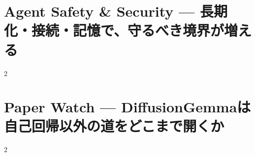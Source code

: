 \documentclass[lualatex,a4paper,11pt]{jlreq}
\begin{document}
\clearpage
\section{Agent Safety \& Security — 長期化・接続・記憶で、守るべき境界が増える}
\label{pkg:agent-safety-security-july}
\vspace{0.15em}
\begin{multicols}{2}

\end{multicols}
\Needspace{0.34\textheight}

\medskip


\clearpage
\section{Paper Watch — DiffusionGemmaは自己回帰以外の道をどこまで開くか}
\label{pkg:paper-watch-july}
\vspace{0.15em}
\begin{multicols}{2}

\end{multicols}


\clearpage

\clearpage
\printbibliography[title={References / Source Notes}]
\end{document}
